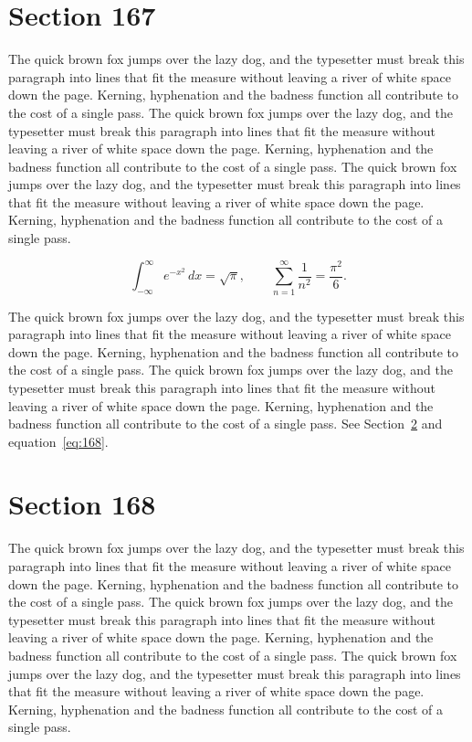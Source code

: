 \documentclass{article}
\begin{document}
\section{Section 167}
\label{sec:167}
The quick brown fox jumps over the lazy dog, and the typesetter must break this paragraph into lines that fit the measure without leaving a river of white space down the page. Kerning, hyphenation and the badness function all contribute to the cost of a single pass. The quick brown fox jumps over the lazy dog, and the typesetter must break this paragraph into lines that fit the measure without leaving a river of white space down the page. Kerning, hyphenation and the badness function all contribute to the cost of a single pass. The quick brown fox jumps over the lazy dog, and the typesetter must break this paragraph into lines that fit the measure without leaving a river of white space down the page. Kerning, hyphenation and the badness function all contribute to the cost of a single pass. 

\begin{equation}\label{eq:167}
\int_{-\infty}^{\infty} e^{-x^{2}}\,dx = \sqrt{\pi}, \qquad
\sum_{n=1}^{\infty} \frac{1}{n^{2}} = \frac{\pi^{2}}{6}.
\end{equation}

The quick brown fox jumps over the lazy dog, and the typesetter must break this paragraph into lines that fit the measure without leaving a river of white space down the page. Kerning, hyphenation and the badness function all contribute to the cost of a single pass. The quick brown fox jumps over the lazy dog, and the typesetter must break this paragraph into lines that fit the measure without leaving a river of white space down the page. Kerning, hyphenation and the badness function all contribute to the cost of a single pass. 
See Section~\ref{sec:168} and equation~\eqref{eq:168}.
\section{Section 168}
\label{sec:168}
The quick brown fox jumps over the lazy dog, and the typesetter must break this paragraph into lines that fit the measure without leaving a river of white space down the page. Kerning, hyphenation and the badness function all contribute to the cost of a single pass. The quick brown fox jumps over the lazy dog, and the typesetter must break this paragraph into lines that fit the measure without leaving a river of white space down the page. Kerning, hyphenation and the badness function all contribute to the cost of a single pass. The quick brown fox jumps over the lazy dog, and the typesetter must break this paragraph into lines that fit the measure without leaving a river of white space down the page. Kerning, hyphenation and the badness function all contribute to the cost of a single pass. 
\end{document}
